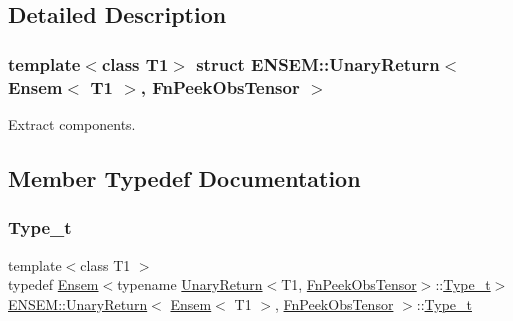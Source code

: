 \subsection{Detailed Description}
\subsubsection*{template$<$class T1$>$\newline
struct E\+N\+S\+E\+M\+::\+Unary\+Return$<$ Ensem$<$ T1 $>$, Fn\+Peek\+Obs\+Tensor $>$}

Extract components. 

\subsection{Member Typedef Documentation}
\mbox{\label{structENSEM_1_1UnaryReturn_3_01Ensem_3_01T1_01_4_00_01FnPeekObsTensor_01_4_a6f60fb6656ccc4fbc31cc64aa1face1f}} 
\subsubsection{\texorpdfstring{Type\_t}{Type\_t}\hspace{0.1cm}{\footnotesize\ttfamily [1/3]}}
{\footnotesize\ttfamily template$<$class T1 $>$ \\
typedef \mbox{\hyperlink{classENSEM_1_1Ensem}{Ensem}}$<$typename \mbox{\hyperlink{structENSEM_1_1UnaryReturn}{Unary\+Return}}$<$T1, \mbox{\hyperlink{structENSEM_1_1FnPeekObsTensor}{Fn\+Peek\+Obs\+Tensor}}$>$\+::\mbox{\hyperlink{structENSEM_1_1UnaryReturn_3_01Ensem_3_01T1_01_4_00_01FnPeekObsTensor_01_4_a6f60fb6656ccc4fbc31cc64aa1face1f}{Type\+\_\+t}}$>$ \mbox{\hyperlink{structENSEM_1_1UnaryReturn}{E\+N\+S\+E\+M\+::\+Unary\+Return}}$<$ \mbox{\hyperlink{classENSEM_1_1Ensem}{Ensem}}$<$ T1 $>$, \mbox{\hyperlink{structENSEM_1_1FnPeekObsTensor}{Fn\+Peek\+Obs\+Tensor}} $>$\+::\mbox{\hyperlink{structENSEM_1_1UnaryReturn_3_01Ensem_3_01T1_01_4_00_01FnPeekObsTensor_01_4_a6f60fb6656ccc4fbc31cc64aa1face1f}{Type\+\_\+t}}}

\mbox{\label{structENSEM_1_1UnaryReturn_3_01Ensem_3_01T1_01_4_00_01FnPeekObsTensor_01_4_a6f60fb6656ccc4fbc31cc64aa1face1f}} 
